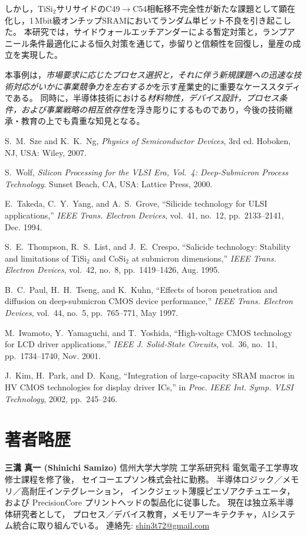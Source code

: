 \documentclass[conference]{IEEEtran}
\begin{document}
しかし，TiSi$_2$サリサイドのC49$\to$C54相転移不完全性が新たな課題として顕在化し，1\,Mbit級オンチップSRAMにおいてランダム単ビット不良を引き起こした。  
本研究では，サイドウォールエッチアンダーによる暫定対策と，ランプアニール条件最適化による恒久対策を通じて，歩留りと信頼性を回復し，量産の成立を実現した。  

本事例は，\emph{市場要求に応じたプロセス選択と，それに伴う新規課題への迅速な技術対応がいかに事業競争力を左右するか}を示す産業史的に重要なケーススタディである。  
同時に，半導体技術における\emph{材料物性，デバイス設計，プロセス条件，および事業戦略の相互依存性}を浮き彫りにするものであり，今後の技術継承・教育の上でも貴重な知見となる。

\begin{thebibliography}{99}

S.~M.~Sze and K.~K.~Ng, \emph{Physics of Semiconductor Devices}, 3rd ed.
Hoboken, NJ, USA: Wiley, 2007.

S.~Wolf, \emph{Silicon Processing for the VLSI Era, Vol.~4: Deep-Submicron Process Technology}.
Sunset Beach, CA, USA: Lattice Press, 2000.

E.~Takeda, C.~Y.~Yang, and A.~S.~Grove, ``Silicide technology for ULSI applications,''
\emph{IEEE Trans. Electron Devices}, vol.~41, no.~12, pp.~2133--2141, Dec. 1994.

S.~E.~Thompson, R.~S.~List, and J.~E.~Crespo, 
``Salicide technology: Stability and limitations of TiSi$_2$ and CoSi$_2$ at submicron dimensions,''
\emph{IEEE Trans. Electron Devices}, vol.~42, no.~8, pp.~1419--1426, Aug. 1995.

B.~C.~Paul, H.~H.~Tseng, and K.~Kuhn,
``Effects of boron penetration and diffusion on deep-submicron CMOS device performance,''
\emph{IEEE Trans. Electron Devices}, vol.~44, no.~5, pp.~765--771, May 1997.

M.~Iwamoto, Y.~Yamaguchi, and T.~Yoshida,
``High-voltage CMOS technology for LCD driver applications,''
\emph{IEEE J. Solid-State Circuits}, vol.~36, no.~11, pp.~1734--1740, Nov. 2001.

J.~Kim, H.~Park, and D.~Kang,
``Integration of large-capacity SRAM macros in HV CMOS technologies for display driver ICs,''
in \emph{Proc. IEEE Int. Symp. VLSI Technology}, 2002, pp.~245--246.

\end{thebibliography}

\section*{著者略歴}
\noindent\textbf{三溝 真一 (Shinichi Samizo)}  
信州大学大学院 工学系研究科 電気電子工学専攻修士課程を修了後，  
セイコーエプソン株式会社に勤務。  
半導体ロジック／メモリ／高耐圧インテグレーション，  
インクジェット薄膜ピエゾアクチュエータ，  
および PrecisionCore プリントヘッドの製品化に従事した。  
現在は独立系半導体研究者として，  
プロセス／デバイス教育，メモリアーキテクチャ，AIシステム統合に取り組んでいる。  
連絡先: \href{mailto:shin3t72@gmail.com}{shin3t72@gmail.com}
\end{document}
